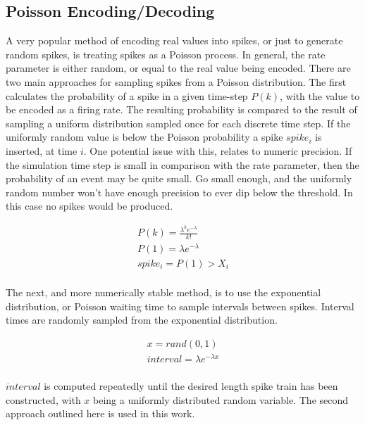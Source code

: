     \subsection{Poisson Encoding/Decoding}
    A very popular method of encoding real values into spikes, or just to
    generate random spikes, is treating spikes as a Poisson process. In general,
    the rate parameter is either random, or equal to the real value being
    encoded. There are two main approaches for sampling spikes from a Poisson
    distribution. The first calculates the probability of a spike in a given
    time-step $P(k)$, with the value to be encoded as a firing rate. The
    resulting probability 
    is compared to the result of sampling a uniform distribution sampled once
    for each discrete time step. If the uniformly random value is below the
    Poisson probability a spike $spike_i$ is inserted, at time $i$. One potential issue
    with this, relates to numeric precision. If the simulation time step is
    small in comparison with the rate parameter, then the probability of an
    event may be quite small. Go small enough, and the uniformly random number
    won't have enough precision to ever dip below the threshold. In this case no
    spikes would be produced.
    
    
    \begin{align}
        P(k) = \frac{\lambda^k e^{-\lambda}}{k!} \\ P(1) = \lambda e^{-\lambda} \\
        spike_i = P(1) > X_i \\
    \end{align}
    
    The next, and more numerically stable method, is to use the exponential
    distribution, or Poisson waiting time to sample intervals between
    spikes. Interval times are randomly sampled from the exponential
    distribution.
    
    \begin{align}
      x = rand(0,1) \\
      interval = \lambda e^{-\lambda x} \\
    \end{align}

    $interval$ is computed repeatedly until the desired length spike train has
    been constructed, with $x$ being a uniformly distributed random
    variable. The second approach outlined here is used in this work.
    
